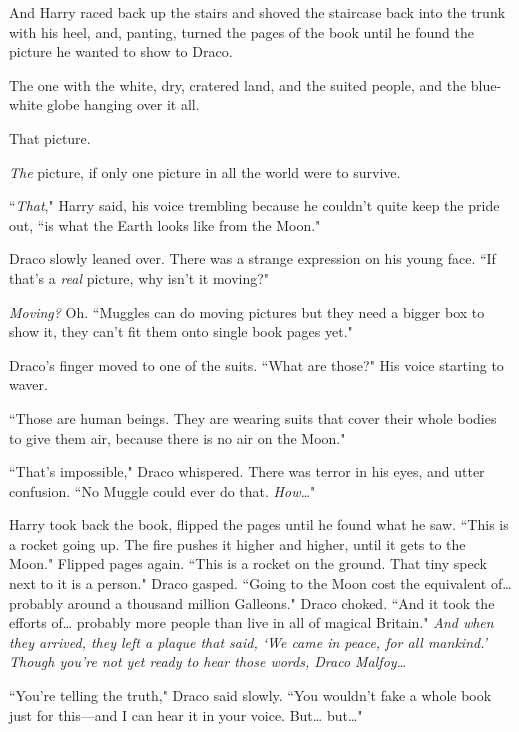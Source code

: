 And Harry raced back up the stairs and shoved the staircase back into the trunk with his heel, and, panting, turned the pages of the book until he found the picture he wanted to show to Draco.

The one with the white, dry, cratered land, and the suited people, and the blue-white globe hanging over it all.

That picture.

\emph{The} picture, if only one picture in all the world were to survive.

``\emph{That}," Harry said, his voice trembling because he couldn't quite keep the pride out, ``is what the Earth looks like from the Moon."

Draco slowly leaned over. There was a strange expression on his young face. ``If that's a \emph{real} picture, why isn't it moving?"

\emph{Moving?} Oh. ``Muggles can do moving pictures but they need a bigger box to show it, they can't fit them onto single book pages yet."

Draco's finger moved to one of the suits. ``What are those?" His voice starting to waver.

``Those are human beings. They are wearing suits that cover their whole bodies to give them air, because there is no air on the Moon."

``That's impossible," Draco whispered. There was terror in his eyes, and utter confusion. ``No Muggle could ever do that. \emph{How{\ldots}}"

Harry took back the book, flipped the pages until he found what he saw. ``This is a rocket going up. The fire pushes it higher and higher, until it gets to the Moon." Flipped pages again. ``This is a rocket on the ground. That tiny speck next to it is a person." Draco gasped. ``Going to the Moon cost the equivalent of{\ldots} probably around a thousand million Galleons." Draco choked. ``And it took the efforts of{\ldots} probably more people than live in all of magical Britain." \emph{And when they arrived, they left a plaque that said, `We came in peace, for all mankind.' Though you're not yet ready to hear those words, Draco Malfoy{\ldots}}

``You're telling the truth," Draco said slowly. ``You wouldn't fake a whole book just for this—and I can hear it in your voice. But{\ldots} but{\ldots}"

